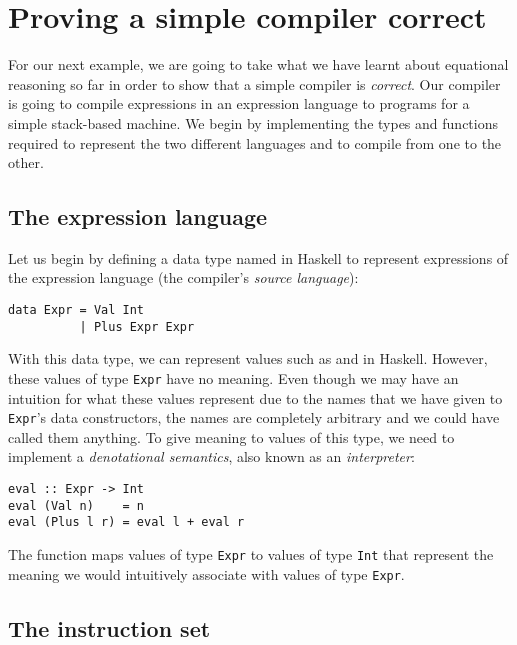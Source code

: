 \section{Proving a simple compiler correct}

For our next example, we are going to take what we have learnt about equational reasoning so far in order to show that a simple compiler is \emph{correct}. Our compiler is going to compile expressions in an expression language to programs for a simple stack-based machine. We begin by implementing the types and functions required to represent the two different languages and to compile from one to the other.

\subsection{The expression language}

Let us begin by defining a data type named  in Haskell to represent expressions of the expression language (the compiler's \emph{source language}):
\begin{verbatim}
data Expr = Val Int 
          | Plus Expr Expr
\end{verbatim}
With this data type, we can represent values such as  and  in Haskell. However, these values of type \texttt{\small Expr} have no meaning. Even though we may have an intuition for what these values represent due to the names that we have given to \texttt{\small Expr}'s data constructors, the names are completely arbitrary and we could have called them anything. To give meaning to values of this type, we need to implement a \emph{denotational semantics}, also known as an \emph{interpreter}:
\begin{verbatim}
eval :: Expr -> Int 
eval (Val n)    = n 
eval (Plus l r) = eval l + eval r
\end{verbatim}
The  function maps values of type \texttt{\small Expr} to values of type \texttt{\small Int} that represent the meaning we would intuitively associate with values of type \texttt{\small Expr}.

\subsection{The instruction set}

